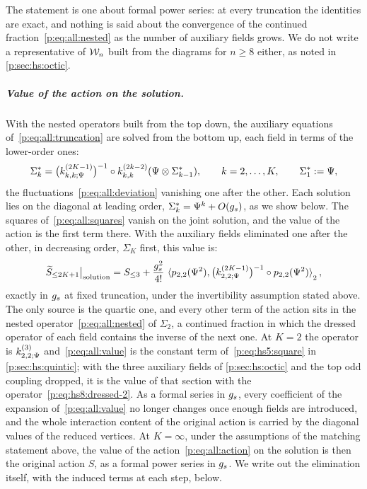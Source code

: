 The statement is one about formal power series: at every truncation the identities are exact, and nothing is said about the convergence of the continued fraction~\eqref{p:eq:all:nested} as the number of auxiliary fields grows.
We do not write a representative of $\mathcal{W}_{n}$ built from the diagrams for $n \ge 8$ either, as noted in \cref{p:sec:hs:octic}.

\subparagraph{Value of the action on the solution.}

With the nested operators built from the top down, the auxiliary equations of~\eqref{p:eq:all:truncation} are solved from the bottom up, each field in terms of the lower-order ones:
\begin{equation}
  \label{p:eq:all:saddles}
  \Sigma_k^*
    = \big( \kin{k}{\Psi}{2 K - 1} \big)^{-1} \circ \kin{k}{}{2 k - 2}(\Psi \otimes \Sigma_{k - 1}^*),
  \qquad
  k = 2, \ldots, K,
  \qquad
  \Sigma_1^*
    := \Psi,
\end{equation}
the fluctuations~\eqref{p:eq:all:deviation} vanishing one after the other.
Each solution lies on the diagonal at leading order, $\Sigma_k^* = \Psi^k + O(g_s)$, as we show below.
The squares of~\eqref{p:eq:all:squares} vanish on the joint solution, and the value of the action is the first term there.
With the auxiliary fields eliminated one after the other, in decreasing order, $\Sigma_K$ first, this value is:
\begin{equation}
  \label{p:eq:all:value}
  \caction[\le 2 K + 1] \big|_{\text{solution}}
    = S_{\le 3} + \frac{\gs^2}{4!} \, \pair[2]{\sprod{2}{2}(\Psi^2)}{\big( \kin{2}{\Psi}{2 K - 1} \big)^{-1} \circ \sprod{2}{2}(\Psi^2)},
\end{equation}
exactly in $g_s$ at fixed truncation, under the invertibility assumption stated above.
The only source is the quartic one, and every other term of the action sits in the nested operator~\eqref{p:eq:all:nested} of $\Sigma_2$, a continued fraction in which the dressed operator of each field contains the inverse of the next one.
At $K = 2$ the operator is $\kin{2}{\Psi}{3}$ and~\eqref{p:eq:all:value} is the constant term of~\eqref{p:eq:hs5:square} in \cref{p:sec:hs:quintic}; with the three auxiliary fields of \cref{p:sec:hs:octic} and the top odd coupling dropped, it is the value of that section with the operator~\eqref{p:eq:hs8:dressed-2}.
As a formal series in $g_s$, every coefficient of the expansion of~\eqref{p:eq:all:value} no longer changes once enough fields are introduced, and the whole interaction content of the original action is carried by the diagonal values of the reduced vertices.
At $K = \infty$, under the assumptions of the matching statement above, the value of the action~\eqref{p:eq:all:action} on the solution is then the original action $S$, as a formal power series in $g_s$.
We write out the elimination itself, with the induced terms at each step, below.

